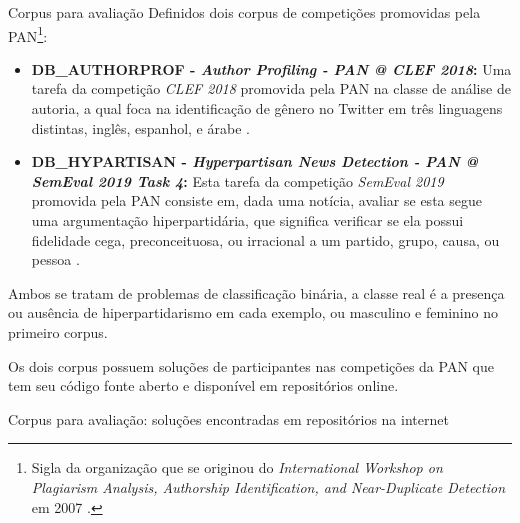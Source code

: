 \documentclass[%
  10pt,%
  aspectratio = 169,%
  compress,%
  t,%
]{beamer}%
\begin{document}
    \begin{frame}{}{Corpus para avaliação}
        Definidos dois corpus de competições promovidas pela PAN\footnote{Sigla da organização que se originou do \textit{International Workshop on Plagiarism Analysis, Authorship Identification, and Near-Duplicate Detection} em 2007 \cite{PAN_Workshop_2007}.}:
        \begin{itemize}
            \item \textbf{DB\_AUTHORPROF - \textit{Author Profiling - PAN @ CLEF 2018}:} Uma tarefa da competição \textit{CLEF 2018} promovida pela PAN na classe de análise de autoria, a qual foca na identificação de gênero no Twitter em três linguagens distintas, inglês, espanhol, e árabe \cite{PAN_APCLEF_2018}.

            \item \textbf{DB\_HYPARTISAN - \textit{Hyperpartisan News Detection - PAN @ SemEval 2019 Task 4}:} Esta tarefa da competição \textit{SemEval 2019} promovida pela PAN consiste em, dada uma notícia, avaliar se esta segue uma argumentação hiperpartidária, que significa verificar se ela possui fidelidade cega, preconceituosa, ou irracional a um partido, grupo, causa, ou pessoa \cite{PAN_HND_2019}.

        \end{itemize}

        Ambos se tratam de problemas de classificação binária, a classe real é a presença ou ausência de hiperpartidarismo em cada exemplo, ou masculino e feminino no primeiro corpus.

        Os dois corpus possuem soluções de participantes nas competições da PAN que tem seu código fonte aberto e disponível em repositórios online.
    \end{frame}

    \begin{frame}{}{Corpus para avaliação: soluções encontradas em repositórios na internet}
        

        
    \end{frame}
\end{document}
